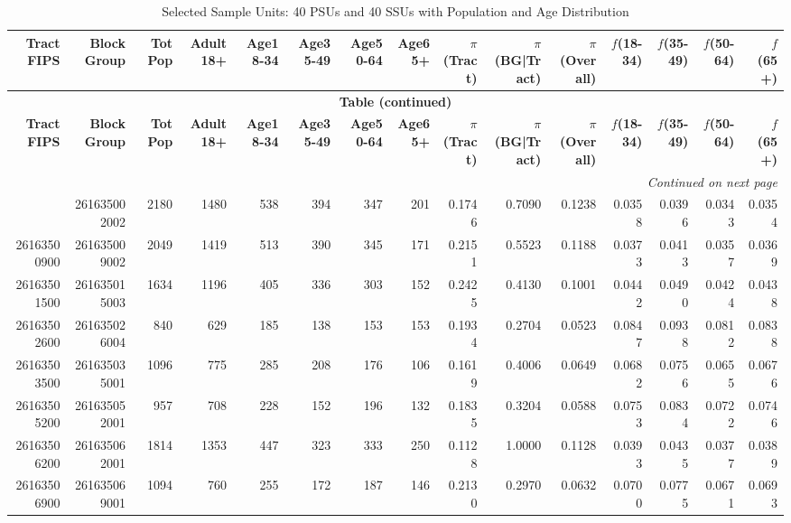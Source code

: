 \documentclass[11pt]{article}
\begin{document}
\begin{landscape}
\begin{longtable}{r|r|r|r|r|r|r|r|r|r|r|r|r|r|r}
\caption{Selected Sample Units: 40 PSUs and 40 SSUs with Population and Age Distribution}\\
\toprule
\textbf{Tract FIPS} & \textbf{Block Group} & \textbf{Tot Pop} & \textbf{Adult18+} & \textbf{Age18-34} & \textbf{Age35-49} & \textbf{Age50-64} & \textbf{Age65+} & \textbf{$\pi$(Tract)} & \textbf{$\pi$(BG|Tract)} & \textbf{$\pi$(Overall)} & \textbf{$f$(18-34)} & \textbf{$f$(35-49)} & \textbf{$f$(50-64)} & \textbf{$f$(65+)} \\
\midrule
\endfirsthead
\multicolumn{15}{c}{{\bfseries Table \thetable{} (continued)}}\\
\toprule
\textbf{Tract FIPS} & \textbf{Block Group} & \textbf{Tot Pop} & \textbf{Adult18+} & \textbf{Age18-34} & \textbf{Age35-49} & \textbf{Age50-64} & \textbf{Age65+} & \textbf{$\pi$(Tract)} & \textbf{$\pi$(BG|Tract)} & \textbf{$\pi$(Overall)} & \textbf{$f$(18-34)} & \textbf{$f$(35-49)} & \textbf{$f$(50-64)} & \textbf{$f$(65+)} \\
\midrule
\endhead
\midrule
\multicolumn{15}{r}{\textit{Continued on next page}}\\
\endfoot
\bottomrule
\endlastfoot
26163500200 & 261635002002 & 2180 & 1480 & 538 & 394 & 347 & 201 & 0.1746 & 0.7090 & 0.1238 & 0.0358 & 0.0396 & 0.0343 & 0.0354 \\
26163500900 & 261635009002 & 2049 & 1419 & 513 & 390 & 345 & 171 & 0.2151 & 0.5523 & 0.1188 & 0.0373 & 0.0413 & 0.0357 & 0.0369 \\
26163501500 & 261635015003 & 1634 & 1196 & 405 & 336 & 303 & 152 & 0.2425 & 0.4130 & 0.1001 & 0.0442 & 0.0490 & 0.0424 & 0.0438 \\
26163502600 & 261635026004 & 840 & 629 & 185 & 138 & 153 & 153 & 0.1934 & 0.2704 & 0.0523 & 0.0847 & 0.0938 & 0.0812 & 0.0838 \\
26163503500 & 261635035001 & 1096 & 775 & 285 & 208 & 176 & 106 & 0.1619 & 0.4006 & 0.0649 & 0.0682 & 0.0756 & 0.0655 & 0.0676 \\
26163505200 & 261635052001 & 957 & 708 & 228 & 152 & 196 & 132 & 0.1835 & 0.3204 & 0.0588 & 0.0753 & 0.0834 & 0.0722 & 0.0746 \\
26163506200 & 261635062001 & 1814 & 1353 & 447 & 323 & 333 & 250 & 0.1128 & 1.0000 & 0.1128 & 0.0393 & 0.0435 & 0.0377 & 0.0389 \\
26163506900 & 261635069001 & 1094 & 760 & 255 & 172 & 187 & 146 & 0.2130 & 0.2970 & 0.0632 & 0.0700 & 0.0775 & 0.0671 & 0.0693 \\

\end{longtable}
\end{landscape}
\end{document}
